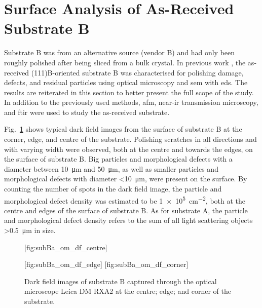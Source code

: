 \clearpage
\section{Surface Analysis of As-Received Substrate B}\label{sec:subBa}
Substrate B was from an alternative source (vendor B) and had only been roughly polished after being sliced from a bulk crystal. In previous work \citep{lauten2017characterisation}, the as-received (111)B-oriented substrate B was characterised for polishing damage, defects, and residual particles using optical microscopy and \ac{sem} with \ac{eds}. The results are reiterated in this section to better present the full scope of the study. In addition to the previously used methods, \ac{afm}, near-\ac{ir} transmission microscopy, and \ac{ftir} were used to study the as-received substrate.

Fig.~\ref{fig:subBa_om_df} shows typical dark field images from the surface of substrate B at the corner, edge, and centre of the substrate. Polishing scratches in all directions and with varying width were observed, both at the centre and towards the edges, on the surface of substrate B. Big particles and morphological defects with a diameter between \SI{10}{\micro\metre} and \SI{50}{\micro\metre}, as well as smaller particles and morphological defects with diameter \SI{<10}{\micro\metre}, were present on the surface. By counting the number of spots in the dark field image, the particle and morphological defect density was estimated to be \SI{1e5}{\centi\metre^{-2}}, both at the centre and edges of the surface of substrate B. As for substrate A, the particle and morphological defect density refers to the sum of all light scattering objects \SI{>0.5}{\micro\metre} in size.

\begin{figure}[htbp]
    \centering
    [fig:subBa_om_df_centre]
    \par\bigskip
    [fig:subBa_om_df_edge]
    \hfill
    [fig:subBa_om_df_corner]
    \caption[Dark field images of substrate B.]{Dark field images of substrate B captured through the optical microscope Leica DM RXA2 at the  centre;  edge; and  corner of the substrate.}
    \label{fig:subBa_om_df}
\end{figure}

